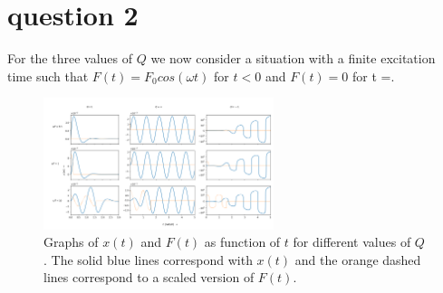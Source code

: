 \section{question 2}

For the three values of $Q$ we now consider a situation with a finite excitation time such that $F(t) = F_0 cos(\omega t)$ for $t<0$ and $F(t) = 0$ for t =.

\begin{figure}[h!] 
	\centering
	\includegraphics[width=0.6\textwidth]{figures/graph_q2.png}
	\caption{Graphs of $x(t)$ and $F(t)$  as function of $t$ for different values of $Q$. The solid blue lines correspond with $x(t)$ and the orange dashed lines correspond to a scaled version of $F(t)$.}
	\label{fig_q1}
\end{figure}